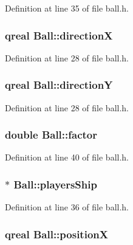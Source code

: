 Definition at line 35 of file ball.h.\hypertarget{class_ball_a2442b2ceb1bdab9cb1d829cc35fb6aa4}{
\subsubsection[{directionX}]{\setlength{\rightskip}{0pt plus 5cm}qreal {\bf Ball::directionX}}}
\label{class_ball_a2442b2ceb1bdab9cb1d829cc35fb6aa4}


Definition at line 28 of file ball.h.\hypertarget{class_ball_aed25c719861fb4a6cc245d4792576fb9}{
\subsubsection[{directionY}]{\setlength{\rightskip}{0pt plus 5cm}qreal {\bf Ball::directionY}}}
\label{class_ball_aed25c719861fb4a6cc245d4792576fb9}


Definition at line 28 of file ball.h.\hypertarget{class_ball_a230382eb75790548b8c504c511449a77}{
\subsubsection[{factor}]{\setlength{\rightskip}{0pt plus 5cm}double {\bf Ball::factor}}}
\label{class_ball_a230382eb75790548b8c504c511449a77}


Definition at line 40 of file ball.h.\hypertarget{class_ball_a056866440103518774a90e7c037e660d}{
\subsubsection[{playersShip}]{$\ast$ {\bf Ball::playersShip}}}
\label{class_ball_a056866440103518774a90e7c037e660d}


Definition at line 36 of file ball.h.\hypertarget{class_ball_a0337f9f0526bac5d34b8ead4d4b1abca}{
\subsubsection[{positionX}]{\setlength{\rightskip}{0pt plus 5cm}qreal {\bf Ball::positionX}}}
\label{class_ball_a0337f9f0526bac5d34b8ead4d4b1abca}


